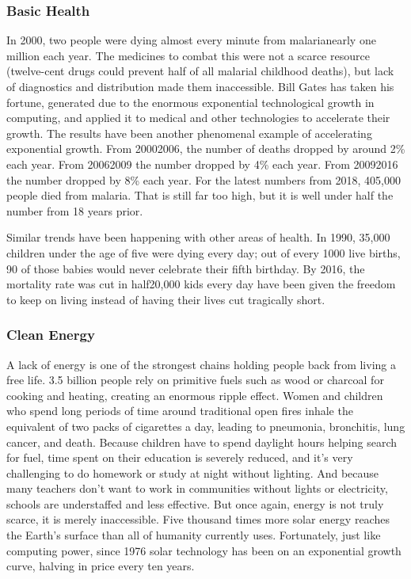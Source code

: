{  \subsubsection*{Basic Health}
  \newReading In 2000, two people were dying almost every minute from
  malaria\textemdash{}nearly one million each year. The medicines to combat this
  were not a scarce resource (twelve-cent drugs could prevent half of all
  malarial childhood deaths), but lack of diagnostics and distribution made them
  inaccessible. Bill Gates has taken his fortune, generated due to the enormous
  exponential technological growth in computing, and applied it to medical and
  other technologies to accelerate their growth. The results have been another
  phenomenal example of accelerating exponential growth. From
  2000\textendash{}2006, the number of deaths dropped by around 2\% each year.
  From 2006\textendash{}2009 the number dropped by 4\% each year. From
  2009\textendash{}2016 the number dropped by 8\% each year. For the latest
  numbers from 2018, 405,000 people died from malaria. That is still far too
  high, but it is well under half the number from 18 years prior.

  Similar trends have been happening with other areas of health. In 1990, 35,000
  children under the age of five were dying every day; out of every 1000 live
  births, 90 of those babies would never celebrate their fifth birthday. By
  2016, the mortality rate was cut in half\textemdash{}20,000 kids every day
  have been given the freedom to keep on living instead of having their lives
  cut tragically short.

  \subsubsection*{Clean Energy}
  \newReading A lack of energy is one of the strongest chains holding people
  back from living a free life. 3.5 billion people rely on primitive fuels such
  as wood or charcoal for cooking and heating, creating an enormous ripple
  effect. Women and children who spend long periods of time around traditional
  open fires inhale the equivalent of two packs of cigarettes a day, leading to
  pneumonia, bronchitis, lung cancer, and death. Because children have to spend
  daylight hours helping search for fuel, time spent on their education is
  severely reduced, and it's very challenging to do homework or study at night
  without lighting. And because many teachers don't want to work in communities
  without lights or electricity, schools are understaffed and less effective.
  But once again, energy is not truly scarce, it is merely inaccessible.  Five
  thousand times more solar energy reaches the Earth's surface than all of
  humanity currently uses. Fortunately, just like computing power, since 1976
  solar technology has been on an exponential growth curve, halving in price
  every ten years.

}
